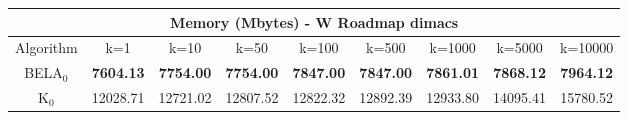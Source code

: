 \begin{tabular}{c|cccccccc}\toprule
\multicolumn{9}{c}{Memory (Mbytes) - W Roadmap dimacs}\\ \midrule
Algorithm & k=1 & k=10 & k=50 & k=100 & k=500 & k=1000 & k=5000 & k=10000 \\ \midrule
BELA$_0$ & \textbf{7604.13} & \textbf{7754.00} & \textbf{7754.00} & \textbf{7847.00} & \textbf{7847.00} & \textbf{7861.01} & \textbf{7868.12} & \textbf{7964.12} \\
K$_0$ & 12028.71 & 12721.02 & 12807.52 & 12822.32 & 12892.39 & 12933.80 & 14095.41 & 15780.52 \\ \bottomrule 
\end{tabular}

